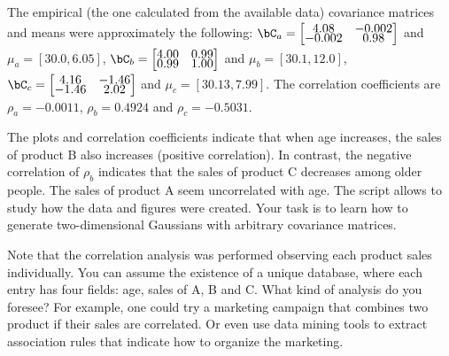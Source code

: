 The empirical (the one calculated from the available data) covariance matrices and means were approximately the following:
$
\bC_a=
\begin{bmatrix}
    4.08 & -0.002 \\[-1ex]
    -0.002 & 0.98 \\
    \end{bmatrix}
$
and
$\mu_a = [30.0,    6.05]$,
$
\bC_b=
\begin{bmatrix}
    4.00 & 0.99 \\[-1ex]
    0.99 & 1.00 \\
    \end{bmatrix}
$
and
$\mu_b = [30.1,   12.0]$,
$
\bC_c=
\begin{bmatrix}
    4.16 & -1.46 \\[-1ex]
    -1.46 & 2.02 \\
    \end{bmatrix}
$
and
$\mu_c = [30.13,   7.99]$. The correlation coefficients are $\rho_a=-0.0011$, $\rho_b=0.4924$ and $\rho_c=-0.5031$.
      
The plots and correlation coefficients indicate that when age increases, the sales of product B also increases (positive correlation). In contrast, the negative correlation of $\rho_b$ indicates that the sales of product C decreases among older people. The sales of product A seem uncorrelated with age. The script  allows to study how the data and figures were created. Your task is to learn how to generate two-dimensional Gaussians with arbitrary covariance matrices.

Note that the correlation analysis was performed observing each product sales individually. You can assume the existence of a unique database, where each entry has four fields: age, sales of A, B and C. What kind of analysis do you foresee? For example, one could try a marketing campaign that combines two product if their sales are correlated. Or even use data mining tools to extract association rules that indicate how to organize the marketing.
\eApplication

